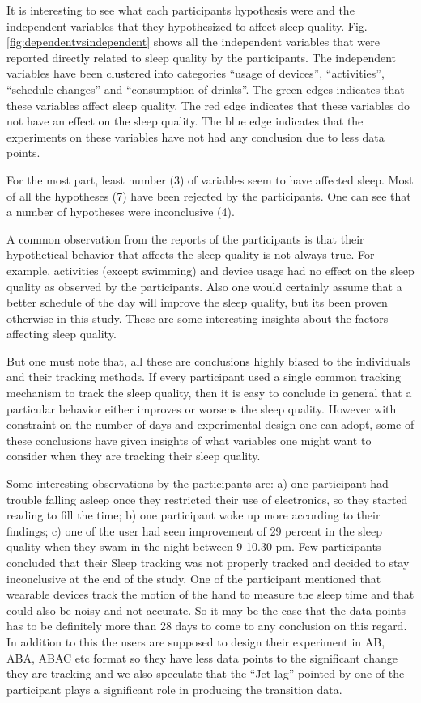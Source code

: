 It is interesting to see what each participant\textquotesingle s hypothesis were and the independent variables that they hypothesized to affect sleep quality. Fig.\ref{fig:dependentvsindependent} shows all the independent variables that were reported directly related to sleep quality by the participants. The independent variables have been clustered into categories \enquote{usage of devices}, \enquote{activities}, \enquote{schedule changes} and \enquote{consumption of drinks}. The green edges indicates that these variables affect sleep quality. The red edge indicates that these variables do not have an effect on the sleep quality. The blue edge indicates that the experiments on these variables have not had any conclusion due to less data points.

For the most part, least number (3) of variables seem to have affected sleep. Most of all the hypotheses (7) have been rejected by the participants. One can see that a number of hypotheses were inconclusive (4). 

A common observation from the reports of the participants is that their hypothetical behavior that affects the sleep quality is not always true. For example, activities (except swimming) and device usage had no effect on the sleep quality as observed by the participants. Also one would certainly assume that a better schedule of the day will improve the sleep quality, but its been proven otherwise in this study. These are some interesting insights about the factors affecting sleep quality. 

But one must note that, all these are conclusions highly biased to the individuals and their tracking methods. If every participant used a single common tracking mechanism to track the sleep quality, then it is easy to conclude in general that a particular behavior either improves or worsens the sleep quality. However with constraint on the number of days and experimental design one can adopt, some of these conclusions have given insights of what variables one might want to consider when they are tracking their sleep quality.

Some interesting observations by the participants are: a) one participant had trouble falling asleep once they restricted their use of electronics, so they started reading to fill the time; b) one participant woke up more according to their findings; c) one of the user had seen improvement of 29 percent in the sleep quality when they swam in the night between 9-10.30 pm. Few participants concluded that their Sleep tracking was not properly tracked and decided to stay inconclusive at the end of the study. One of the participant mentioned that wearable devices track the motion of the hand to measure the sleep time and that could also be noisy and not accurate. So it may be the case that the data points has to be definitely more than 28 days to come to any conclusion on this regard. In addition to this the users are supposed to design their experiment in AB, ABA, ABAC etc format so they have less data points to the significant change they are tracking and we also speculate that the \enquote{Jet lag} pointed by one of the participant plays a significant role in producing the transition data.

